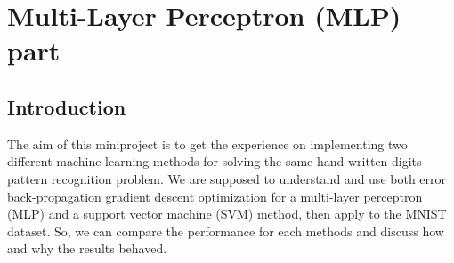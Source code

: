 \section{Multi-Layer Perceptron (MLP) part}
\subsection{Introduction}
	The aim of this miniproject is to get the experience on implementing two different machine learning methods for solving the same hand-written digits pattern recognition problem. We are supposed to understand and use both error back-propagation gradient descent optimization for a multi-layer perceptron (MLP) and a support vector machine (SVM) method, then apply to the MNIST dataset. So, we can compare the performance for each methods and discuss how and why the results behaved.

